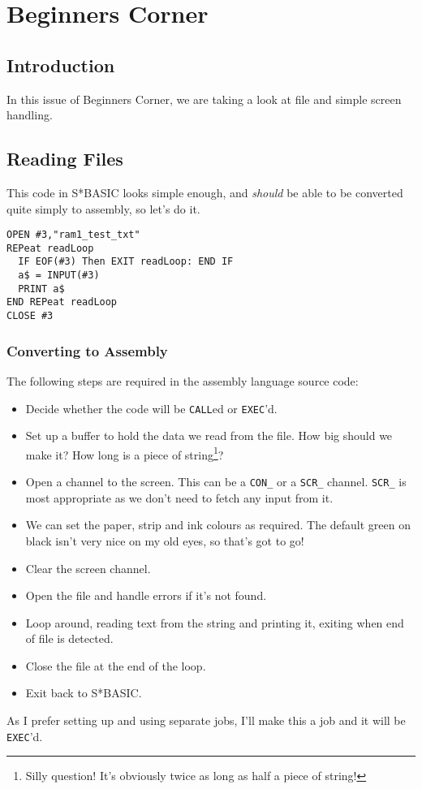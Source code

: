 
\chapter{Beginners Corner}

\section{Introduction}

In this issue of Beginners Corner, we are taking a look at file and
simple screen handling.

\section{Reading Files}

This code in S{*}BASIC looks simple enough, and \emph{should} be able
to be converted quite simply to assembly, so let's do it.

\begin{lstlisting}[language={[Visual]Basic},showstringspaces=false,tabsize=4]
OPEN #3,"ram1_test_txt" 
REPeat readLoop 
  IF EOF(#3) Then EXIT readLoop: END IF
  a$ = INPUT(#3)
  PRINT a$
END REPeat readLoop 
CLOSE #3
\end{lstlisting}


\subsection{Converting to Assembly}

The following steps are required in the assembly language source code:
\begin{itemize}
\item Decide whether the code will be \texttt{CALL}ed or \texttt{EXEC}'d.
\item Set up a buffer to hold the data we read from the file. How big should
we make it? How long is a piece of string\footnote{Silly question! It's obviously twice as long as half a piece of string!}?
\item Open a channel to the screen. This can be a \texttt{CON\_} or a \texttt{SCR\_}
channel. \texttt{SCR\_} is most appropriate as we don't need to fetch
any input from it.
\item We can set the paper, strip and ink colours as required. The default
green on black isn't very nice on my old eyes, so that's got to go!
\item Clear the screen channel.
\item Open the file and handle errors if it's not found.
\item Loop around, reading text from the string and printing it, exiting
when end of file is detected.
\item Close the file at the end of the loop.
\item Exit back to S{*}BASIC.
\end{itemize}
As I prefer setting up and using separate jobs, I'll make this a job
and it will be \texttt{EXEC}'d.

